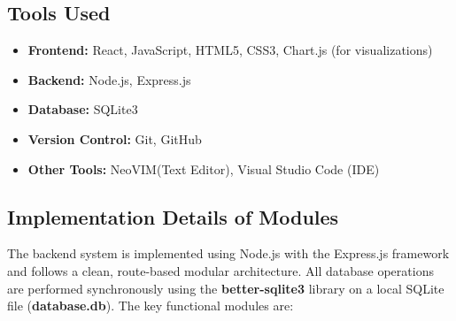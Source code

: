\documentclass[12pt]{report}
\begin{document}
\subsection{Tools Used}
\begin{itemize}
    \item \textbf{Frontend:} React, JavaScript, HTML5, CSS3, Chart.js (for visualizations)
    \item \textbf{Backend:} Node.js, Express.js
    \item \textbf{Database:} SQLite3
    \item \textbf{Version Control:} Git, GitHub
    \item \textbf{Other Tools:} NeoVIM(Text Editor), Visual Studio Code (IDE)
\end{itemize}

\subsection{Implementation Details of Modules}

The backend system is implemented using Node.js with the Express.js framework and follows a clean, route-based modular architecture. All database operations are performed synchronously using the \textbf{better-sqlite3} library on a local SQLite file (\textbf{database.db}). The key functional modules are:
\end{document}
